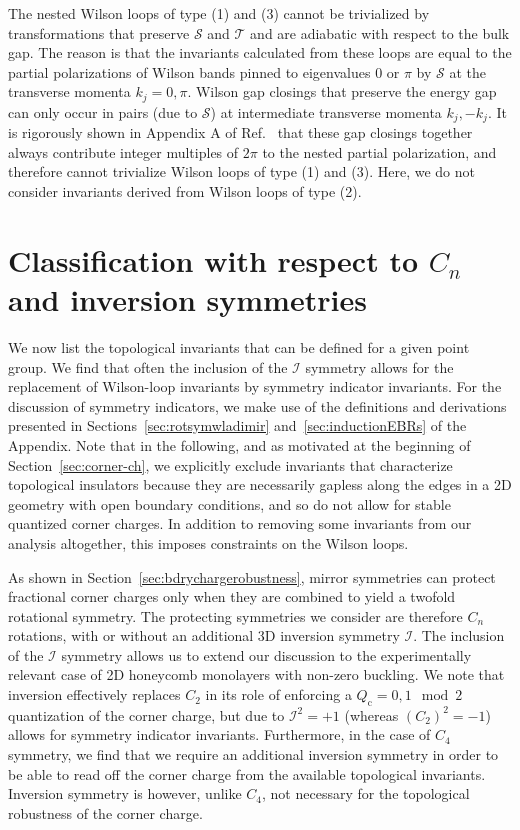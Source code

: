 The nested Wilson loops of type (1) and (3) cannot be trivialized by transformations that preserve $\mathcal{S}$ and $\mathcal{T}$ and are adiabatic with respect to the bulk gap. The reason is that the invariants calculated from these loops are equal to the partial polarizations of Wilson bands pinned to eigenvalues $0$ or $\pi$ by $\mathcal{S}$ at the transverse momenta $k_j = 0, \pi$. Wilson gap closings that preserve the energy gap can only occur in pairs (due to $\mathcal{S}$) at intermediate transverse momenta $k_j, -k_j$. It is rigorously shown in Appendix A of Ref.~\cite{Sander2DTCI2019} that these gap closings together always contribute integer multiples of $2\pi$ to the nested partial polarization, and therefore cannot trivialize Wilson loops of type (1) and (3). Here, we do not consider invariants derived from Wilson loops of type (2).

\section{Classification with respect to $C_n$ and inversion symmetries}
\label{sec:class-symm}
We now list the topological invariants that can be defined for a given point group. We find that often the inclusion of the $\mathcal{I}$ symmetry allows for the replacement of Wilson-loop invariants by symmetry indicator invariants. For the discussion of symmetry indicators, we make use of the definitions and derivations presented in Sections~\ref{sec:rotsymwladimir} and~\ref{sec:inductionEBRs} of the Appendix. Note that in the following, and as motivated at the beginning of Section~\ref{sec:corner-ch}, we explicitly exclude invariants that characterize topological insulators because they are necessarily gapless along the edges in a 2D geometry with open boundary conditions, and so do not allow for stable quantized corner charges. In addition to removing some invariants from our analysis altogether, this imposes constraints on the Wilson loops.

As shown in Section~\ref{sec:bdrychargerobustness}, mirror symmetries can protect fractional corner charges only when they are combined to yield a twofold rotational symmetry. The protecting symmetries we consider are therefore $C_n$ rotations, with or without an additional 3D inversion symmetry $\mathcal{I}$. The inclusion of the $\mathcal{I}$ symmetry allows us to extend our discussion to the experimentally relevant case of 2D honeycomb monolayers with non-zero buckling. We note that inversion effectively replaces $C_2$ in its role of enforcing a $Q_\mathrm{c} = 0,1\mod 2$ quantization of the corner charge, but due to $\mathcal{I}^2 = +1$ (whereas $(C_2)^2 = -1$) allows for symmetry indicator invariants. Furthermore, in the case of $C_4$ symmetry, we find that we require an additional inversion symmetry in order to be able to read off the corner charge from the available topological invariants. Inversion symmetry is however, unlike $C_4$, not necessary for the topological robustness of the corner charge.

